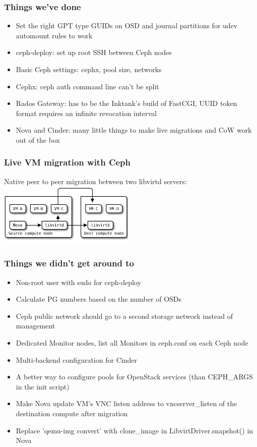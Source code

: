 \documentclass[hyperref=unicode,utf8,xcolor=pst]{beamer}
\begin{document}
\begin{frame}
	\frametitle{Things we've done}
	\begin{itemize}
		\item Set the right GPT type GUIDs on OSD and journal
			partitions for udev automount rules to work
		\item ceph-deploy: set up root SSH between Ceph nodes
		\item Basic Ceph settings: cephx, pool size, networks
		\item Cephx: ceph auth command line can't be split
		\item Rados Gateway: has to be the Inktank's build of
			FastCGI, UUID token format requires an infinite
			revocation interval
		\item Nova and Cinder: many little things to make live
			migrations and CoW work out of the box
	\end{itemize}
\end{frame}

\begin{frame}
	\frametitle{Live VM migration with Ceph}
	Native peer to peer migration between two libvirtd servers:\\
	\includegraphics[height=3cm]{libvirt-p2p-migration}
\end{frame}

\begin{frame}
	\frametitle{Things we didn't get around to}
	\begin{itemize}
		\item Non-root user with sudo for ceph-deploy
		\item Calculate PG numbers based on the number of OSDs
		\item Ceph public network should go to a second storage
			network instead of management
		\item Dedicated Monitor nodes, list all Monitors in
			ceph.conf on each Ceph node
		\item Multi-backend configuration for Cinder
		\item A better way to configure pools for OpenStack
			services (than CEPH\_ARGS in the init script)
		\item Make Nova update VM's VNC listen address to
			vncserver\_listen of the destination compute
			after migration
		\item Replace 'qemu-img convert' with clone\_image in
			LibvirtDriver.snapshot() in Nova
	\end{itemize}
\end{frame}
\end{document}
